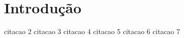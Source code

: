 \documentclass[12pt,a4paper,oneside,header=plain,tocpage=prefix]{report}
\begin{document}
\onehalfspacing






\tableofcontents
\newpage
\listoffigures
{}%
\newpage
\listoftables
{}%
\newpage
\onehalfspacing
%
\chapter{Introdução}

citacao 2 \cite{balanis3}
citacao 3 \cite{microwaverf}
citacao 4 \cite{arraybasics}
citacao 5 \cite{pozar4}
citacao 6 \cite{rfcircuit}
citacao 7 \cite{microwavehandbook}

\end{document}
